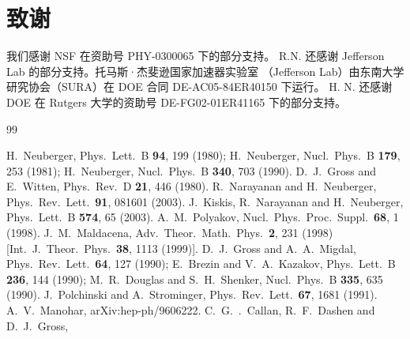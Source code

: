 \section*{致谢}

我们感谢 NSF 在资助号 PHY-0300065 下的部分支持。
R.N. 还感谢 Jefferson Lab 的部分支持。托马斯·杰斐逊国家加速器实验室
（Jefferson Lab）由东南大学研究协会（SURA）在 DOE 合同 DE-AC05-84ER40150 下运行。
H. N. 还感谢 DOE 在 Rutgers 大学的资助号
DE-FG02-01ER41165 下的部分支持。

\begin{thebibliography}{99}

H.~Neuberger,
  Phys.\ Lett.\ B {\bf 94}, 199 (1980);
H.~Neuberger,
  Nucl.\ Phys.\ B {\bf 179}, 253 (1981);
  H.~Neuberger,
  Nucl.\ Phys.\ B {\bf 340}, 703 (1990).
D.~J.~Gross and E.~Witten,
  Phys.\ Rev.\ D {\bf 21}, 446 (1980).
R.~Narayanan and H.~Neuberger,
  Phys.\ Rev.\ Lett.\  {\bf 91}, 081601 (2003).
J.~Kiskis, R.~Narayanan and H.~Neuberger,
  Phys.\ Lett.\ B {\bf 574}, 65 (2003).
A.~M.~Polyakov,
  Nucl.\ Phys.\ Proc.\ Suppl.\  {\bf 68}, 1 (1998).
J.~M.~Maldacena,
  Adv.\ Theor.\ Math.\ Phys.\  {\bf 2}, 231 (1998)
  [Int.\ J.\ Theor.\ Phys.\  {\bf 38}, 1113 (1999)].
D.~J.~Gross and A.~A.~Migdal,
  Phys.\ Rev.\ Lett.\  {\bf 64}, 127 (1990);
E.~Brezin and V.~A.~Kazakov,
  Phys.\ Lett.\ B {\bf 236}, 144 (1990);
  M.~R.~Douglas and S.~H.~Shenker,
  Nucl.\ Phys.\ B {\bf 335}, 635 (1990).
 J.~Polchinski and A.~Strominger,
  Phys.\ Rev.\ Lett.\  {\bf 67}, 1681 (1991).
  A.~V.~Manohar,
  arXiv:hep-ph/9606222.
C.~G.~.~Callan, R.~F.~Dashen and D.~J.~Gross,

\end{thebibliography}
